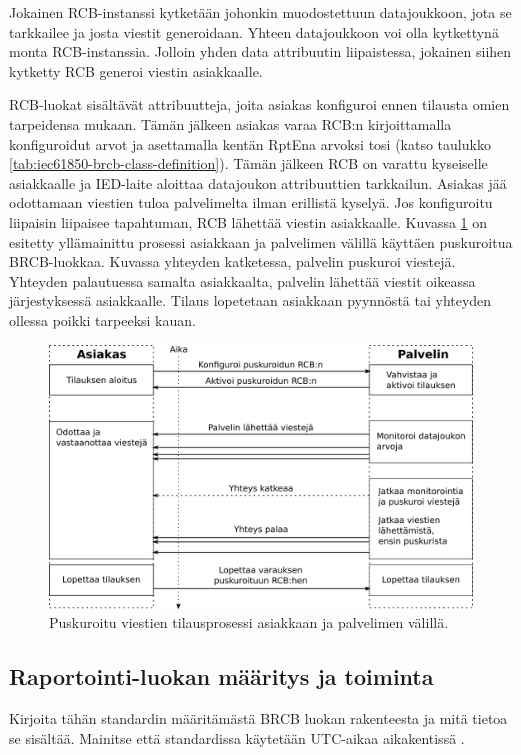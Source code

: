 Jokainen RCB-instanssi kytketään johonkin muodostettuun datajoukkoon, jota se tarkkailee ja josta viestit generoidaan. Yhteen datajoukkoon voi olla kytkettynä monta RCB-instanssia. Jolloin yhden data attribuutin liipaistessa, jokainen siihen kytketty RCB generoi viestin asiakkaalle.

RCB-luokat sisältävät attribuutteja, joita asiakas konfiguroi ennen tilausta omien tarpeidensa mukaan. Tämän jälkeen asiakas varaa RCB:n kirjoittamalla konfiguroidut arvot ja asettamalla kentän RptEna arvoksi tosi (katso taulukko \ref{tab:iec61850-brcb-class-definition}). Tämän jälkeen RCB on varattu kyseiselle asiakkaalle ja IED-laite aloittaa datajoukon attribuuttien tarkkailun. Asiakas jää odottamaan viestien tuloa palvelimelta ilman erillistä kyselyä. Jos konfiguroitu liipaisin liipaisee tapahtuman, RCB lähettää viestin asiakkaalle. Kuvassa \ref{fig:iec61850-brcb-communication} on esitetty yllämainittu prosessi asiakkaan ja palvelimen välillä käyttäen puskuroitua BRCB-luokkaa. Kuvassa yhteyden katketessa, palvelin puskuroi viestejä. Yhteyden palautuessa samalta asiakkaalta, palvelin lähettää viestit oikeassa järjestyksessä asiakkaalle. Tilaus lopetetaan asiakkaan pyynnöstä tai yhteyden ollessa poikki tarpeeksi kauan.

\begin{figure}
	\includegraphics[width=1\textwidth]{pictures/iec61850-brcb-communication.png}
	\caption{Puskuroitu viestien tilausprosessi asiakkaan ja palvelimen välillä.}
	\label{fig:iec61850-brcb-communication}
\end{figure}


\subsection{Raportointi-luokan määritys ja toiminta}
\begin{it}
	Kirjoita tähän standardin määritämästä BRCB luokan rakenteesta ja mitä tietoa se sisältää.
	Mainitse että standardissa käytetään UTC-aikaa aikakentissä \cite[s.~50]{IEC61850-7-1}.
\end{it}

